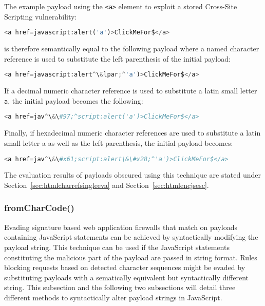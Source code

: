 The example payload using the \verb|<a>| element to exploit a stored Cross-Site Scripting vulnerability:

\begin{lstlisting}[style=basicStyle, language=Python, escapeinside=\^\^]
<a href=javascript:alert('a')>ClickMeFor$</a>
\end{lstlisting}

is therefore semantically equal to the following payload where a named character reference is used to substitute the left parenthesis of the initial payload:

\begin{lstlisting}[style=basicStyle, language=Python, escapeinside=\^\^]
<a href=javascript:alert^\&lpar;^'a')>ClickMeFor$</a>
\end{lstlisting}

If a decimal numeric character reference is used to substitute a latin small letter \verb|a|, the initial payload becomes the following:

\begin{lstlisting}[style=basicStyle, language=Python, escapeinside=\^\^]
<a href=jav^\&\#97;^script:alert('a')>ClickMeFor$</a>
\end{lstlisting}

Finally, if hexadecimal numeric character references are used to substitute a latin small letter a as well as the left parenthesis, the initial payload becomes:

\begin{lstlisting}[style=basicStyle, language=Python, escapeinside=\^\^]
<a href=jav^\&\#x61;script:alert\&\#x28;^'a')>ClickMeFor$</a>
\end{lstlisting}

The evaluation results of payloads obscured using this technique are stated under Section~\ref{sec:htmlcharrefsingleeva} and Section~\ref{sec:htmlencjsesc}.

\subsubsection{fromCharCode()}
\label{sec:fromcharcodetech}
Evading signature based web application firewalls that match on payloads containing JavaScript statements can be achieved by syntactically modifying the payload string. This technique can be used if the JavaScript statements constituting the malicious part of the payload are passed in string format.
Rules blocking requests based on detected character sequences might be evaded by substituting payloads with a sematically equivalent but syntactically different string. This subsection and the following two subsections will detail three different methods to syntactically alter payload strings in JavaScript. \\


